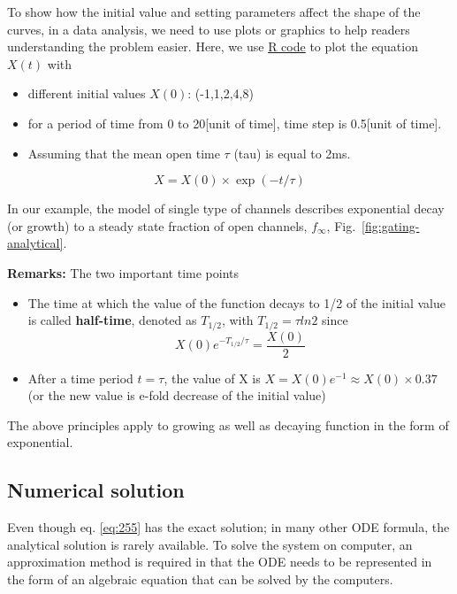 To show how the initial value and setting parameters affect the shape
of the curves, in a data analysis, we need to use plots or graphics to
help readers understanding the problem easier. Here, we use
\hyperref[chap1.1.r]{R code} to plot the equation $X(t)$ with
\begin{itemize}
\item different initial values $X(0)$: (-1,1,2,4,8)

\item for a period of time from 0 to 20[unit of time], time step is
  0.5[unit of time].
\item Assuming that the mean open time $\tau$ (tau) is equal to 2ms.
\end{itemize}
\begin{equation}
  \label{eq:47}
  X = X(0) \times \exp({-t/\tau})
\end{equation}

In our example, the model of single type of channels describes
exponential decay (or growth) to a steady state fraction of open
channels, $f_\infty$, Fig.~\ref{fig:gating-analytical}.

{\bf Remarks:} The two important time points
\begin{itemize}
\item The time at which the value of the function decays to 1/2 of the
  initial value is called {\bf half-time},  denoted as $T_{1/2}$, with
  $T_{1/2} = \tau ln2$ since 
  \begin{equation}
    \label{eq:16}
    X(0) e^{-T_{1/2}/\tau} = \frac{X(0)}{2}
  \end{equation}
\item After a time period $t=\tau$, the value of X is $X = X(0)e^{-1}
  \approx X(0) \times 0.37$ (or the new value is e-fold decrease of
  the initial value)
\end{itemize}
The above principles apply to growing as well as decaying function in
the form of exponential. 


\subsection{Numerical solution}
\label{sec:numerical-solution-first-order-system}

Even though eq. \eqref{eq:255} has the exact solution; in many other ODE
formula, the analytical solution is rarely available. To solve the system on
computer, an approximation method is required in that the ODE needs to be
represented in the form of an algebraic equation that can be solved by the
computers.


